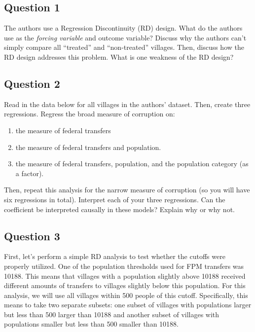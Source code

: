 \documentclass[]{article}
\begin{document}
\subsection{Question 1}\label{question-1}

The authors use a Regression Discontinuity (RD) design. What do the
authors use as the \emph{forcing variable} and outcome variable? Discuss
why the authors can't simply compare all ``treated'' and ``non-treated''
villages. Then, discuss how the RD design addresses this problem. What
is one weakness of the RD design?

\subsection{Question 2}\label{question-2}

Read in the data below for all villages in the authors' dataset. Then,
create three regressions. Regress the broad measure of corruption on:

\begin{enumerate}
\def\labelenumi{\arabic{enumi}.}
\itemsep1pt\parskip0pt
\item
  the measure of federal transfers
\item
  the measure of federal transfers and population.
\item
  the measure of federal transfers, population, and the population
  category (as a factor).
\end{enumerate}

Then, repeat this analysis for the narrow measure of corruption (so you
will have six regressions in total). Interpret each of your three
regressions. Can the coefficient be interpreted causally in these
models? Explain why or why not.

\subsection{Question 3}\label{question-3}

First, let's perform a simple RD analysis to test whether the cutoffs
were properly utilized. One of the population thresholds used for FPM
transfers was 10188. This means that villages with a population slightly
above 10188 received different amounts of transfers to villages slightly
below this population. For this analysis, we will use all villages
within 500 people of this cutoff. Specifically, this means to take two
separate subsets: one subset of villages with populations larger but
less than 500 larger than 10188 and another subset of villages with
populations smaller but less than 500 smaller than 10188.
\end{document}
